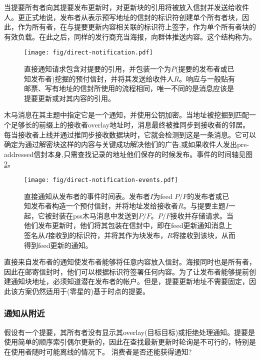 当提要所有者向其提要发布更新时，对更新块的引用将被放入信封并发送给收件人。更正式地说，发布者从表示预写地址的信封的标识符创建单个所有者块，因此，作为所有者，在与提要更新内容相关联的标识符上签字，作为单个所有者块的有效负载。在此之后，同样的发行商充当海报，向群体推送内容。这个结构称为。 

\begin{figure}[htbp]
   \centering
   \texttt{[image: fig/direct-notification.pdf]}
   \caption[直接通知请求和响应\statusgreen]{直接通知请求包含对提要的引用，并包装一个为$P$(提要的发布者或已知发布者)挖掘的预付信封，并将其发送给收件人$R$。响应与一般贴有邮票、写有地址的信封所使用的流程相同，唯一不同的是消息应该是提要更新或对其内容的引用。}
   \label{fig:direct-notification}
\end{figure}

木马消息在其主题中指定它是一个通知，并使用公钥加密。当地址被挖掘到匹配一个足够长的前缀上的接收者overlay地址时，消息最终被推同步到接收者的邻居。每当接收者上线并通过推同步接收数据块时，它就会检测到这是一条消息。它可以确定为通过解密块这样的内容与关键成功解决他们的广告,或如果收件人发出pre-addressed信封本身,只需查找记录的地址他们保存的时候发布。事件的时间轴见图\ref{fig:direct-notification-events}。


\begin{figure}[htbp]
   \centering
    \texttt{[image: fig/direct-notification-events.pdf]}
   \caption[直接通知从发布者的事件时间表\statusgreen]{直接通知从发布者的事件时间表。发布者$I$为feed $P/F$的发布者或已知发布者构造一个预付信封，并将地址发给接收者$R$。与提要主题$I$一起，它被封装在pss木马消息中发送到$P/F$。$P/F$接收并存储请求。当他们发布更新时，他们将其包装在信封中，即在feed更新通知消息上签名从$I$接收到的标识符，并将其作为块发布，$R$将接收到该块，从而得到feed更新的通知。 }
   \label{fig:direct-notification-events}
\end{figure}


直接来自发布者的通知使发布者能够将任意内容放入信封。海报同时也是所有者，因此在邮寄信封时，他们可以根据标识符签署任何内容。为了让发布者能够提前创建通知块地址，必须知道潜在发布者的帐户。但是，提要更新地址不需要固定，因此该方案仍然适用于(零星的)基于时点的提要。

\subsubsection{通知从附近}

假设有一个提要，其所有者没有显示其overlay(目标目标)或拒绝处理通知。提要是使用简单的顺序索引偶尔更新的，因此在查找最新更新时轮询是不可行的，特别是在使用者随时可能离线的情况下。
消费者是否还能获得通知?

